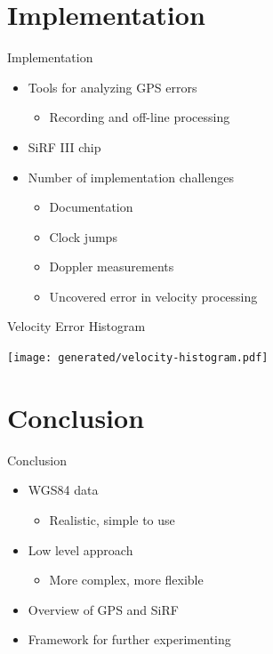\documentclass[utf8,12pt]{beamer}
\begin{document}
\section{Implementation}
{
\begin{frame}{Implementation}
    \begin{itemize}
        \item Tools for analyzing GPS errors
        \begin{itemize}
            \item Recording and off-line processing
        \end{itemize}
        \item SiRF III chip
        \item Number of implementation challenges
        \begin{itemize}
            \item Documentation
            \item Clock jumps
            \item Doppler measurements
            \item Uncovered error in velocity processing
        \end{itemize}
    \end{itemize}
\end{frame}
}

\begin{frame}[plain]{Velocity Error Histogram}
\begin{center}
\centerline{\texttt{[image: generated/velocity-histogram.pdf]}}
\end{center}
\end{frame}

\section{Conclusion}
\begin{frame}{Conclusion}
    \begin{itemize}
        \item WGS84 data
        \begin{itemize}
            \item Realistic, simple to use
        \end{itemize}
        \item Low level approach
        \begin{itemize}
            \item More complex, more flexible
        \end{itemize}
        \item Overview of GPS and SiRF
        \item Framework for further experimenting
    \end{itemize}
\end{frame}
\end{document}
